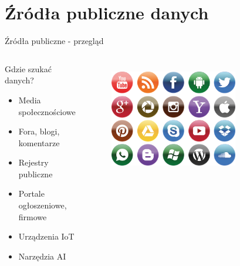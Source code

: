 \section{Źródła publiczne danych}

\begin{frame}{Źródła publiczne - przegląd}
\begin{columns}[c]
    \begin{alertblock}{Gdzie szukać danych?}
        \begin{itemize}
          \item Media społecznościowe
          \item Fora, blogi, komentarze
          \item Rejestry publiczne
          \item Portale ogłoszeniowe, firmowe
          \item Urządzenia IoT
          \item Narzędzia AI
        \end{itemize}
        \end{alertblock}
    \centering
    \begin{figure}
        \centering
        \includegraphics[width=0.75\textwidth]{images/socialMedia.png}
        \label{fig:socialMedia}
    \end{figure}    
\end{columns}
\end{frame}

